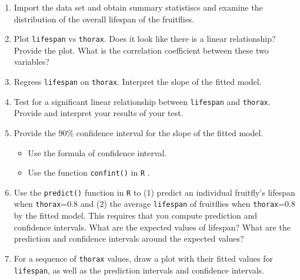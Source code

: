 \documentclass[12pt,letterpaper]{article}
\begin{document}
	\begin{enumerate}
		
		\item
		Import the data set and obtain summary statistiscs and examine the distribution of the overall lifespan of the fruitflies.  
		
		\newpage
		\item
		Plot \texttt{lifespan} vs \texttt{thorax}. Does it look like there is a linear relationship? Provide the plot. What is the correlation coefficient between these two variables?
		\vspace{6cm}
		\item
		Regress \texttt{lifespan} on \texttt{thorax}.  Interpret the slope of the fitted model.
		\vspace{6cm}
		\item
		Test for a significant linear relationship between  \texttt{lifespan} and \texttt{thorax}. Provide and interpret your results of your test.
		
		\newpage
		\item
		
		Provide the 90\% confidence interval for the slope of the fitted model.
		
		\vspace{.5cm}
		\begin{itemize}
			\item
			Use the formula of confidence interval.		\vspace{.5cm}
			\item
			Use the function  \texttt{confint()}  in \texttt{R} .
		\end{itemize}
		\vspace{6cm}
		\item Use the \texttt{predict()} function in \texttt{R} to (1) predict an individual fruitfly's lifespan when \texttt{thorax}=0.8 and (2) the average \texttt{lifespan} of fruitflies when \texttt{thorax}=0.8 by the fitted model. This requires that you compute prediction and confidence intervals. What are the expected values of lifespan? What are the prediction and confidence intervals around the expected values? 
		
		\vspace{6cm}
		\item	For a sequence of \texttt{thorax} values, draw a plot with their fitted values for \texttt{lifespan}, as well as the prediction intervals and confidence intervals.
		
		
		
	\end{enumerate}
\end{document}
